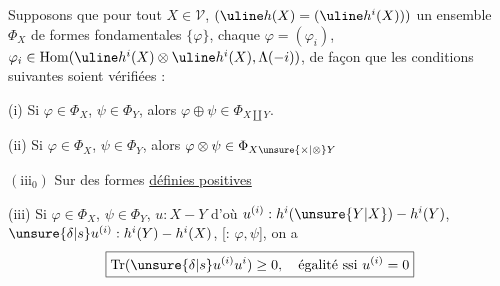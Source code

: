 Supposons que pour tout $X\in\mathcal V$, 
$(\uline h(X)=(\uline h^i(X)))$
un ensemble $\Phi_X$ de formes fondamentales
$\{\varphi\}$, chaque $\varphi=(\varphi_i)$,
$\varphi_i\in\operatorname{Hom}(\uline h^i(X)\otimes\uline h^i(X),
\Lambda(-i))$, de façon que les conditions suivantes
soient vérifiées :

(i) Si $\varphi\in\Phi_X$, $\psi\in\Phi_Y$, alors
$\varphi\oplus\psi\in\Phi_{X\amalg Y}$.

(ii) Si $\varphi\in\Phi_X$, $\psi\in\Phi_Y$,
alors $\varphi\otimes\psi\in\Phi_{X\unsure{\times|\otimes}Y}$

$(\mathrm{iii}_0)$ Sur
des formes \uline{définies positives}
\margin{[il suffit $X=e$ \deleted{\unsure{lorsque}}]}

 

(iii) Si $\varphi\in\Phi_X$, $\psi\in\Phi_Y$,
$u:X\mathbin{-}Y$ d'où
$u^{(i)}:h^i(\unsure{Y|X})\mathbin{-}h^i(Y)$,
 $\unsure{\delta|s}u^{(i)}:h^i(Y)\mathbin{-}h^i(X)$,
[: $\varphi,\psi$], on a
\[
\boxed{\operatorname{Tr}(\unsure{\delta|s}u^{(i)}u^i)\geq0,
\quad\text{égalité ssi }u^{(i)}=0}
\]
